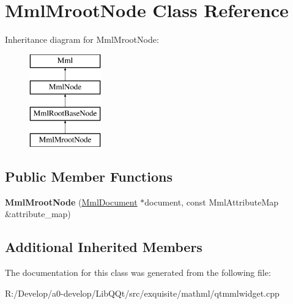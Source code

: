 \hypertarget{class_mml_mroot_node}{}\section{Mml\+Mroot\+Node Class Reference}
\label{class_mml_mroot_node}
Inheritance diagram for Mml\+Mroot\+Node\+:\begin{figure}[H]
\begin{center}
\leavevmode
\includegraphics[height=4.000000cm]{class_mml_mroot_node}
\end{center}
\end{figure}
\subsection*{Public Member Functions}
\begin{DoxyCompactItemize}
\item 
\mbox{\label{class_mml_mroot_node_ab8444547f515dcf12bb809c731aede9c}} 
{\bfseries Mml\+Mroot\+Node} (\mbox{\hyperlink{class_mml_document}{Mml\+Document}} $\ast$document, const Mml\+Attribute\+Map \&attribute\+\_\+map)
\end{DoxyCompactItemize}
\subsection*{Additional Inherited Members}


The documentation for this class was generated from the following file\+:\begin{DoxyCompactItemize}
\item 
R\+:/\+Develop/a0-\/develop/\+Lib\+Q\+Qt/src/exquisite/mathml/qtmmlwidget.\+cpp\end{DoxyCompactItemize}
